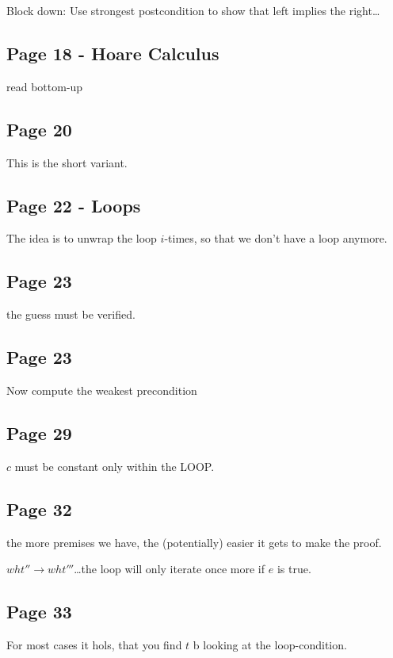 \documentclass[a4paper]{article}
\begin{document}
Block down: Use strongest postcondition to show that left implies the right\ldots

\subsection{Page 18 - Hoare Calculus}
read bottom-up

\subsection{Page 20}

This is the short variant.

\subsection{Page 22 - Loops}
The idea is to unwrap the loop $i$-times, so that we don't have a loop anymore.

\subsection{Page 23} the guess must be verified.

\subsection{Page 23}
Now compute the weakest precondition


\subsection{Page 29}
$c$ must be constant only within the LOOP.

\subsection{Page 32}
the more premises we have, the (potentially) easier it gets to make the proof.

$wht'' \rightarrow wht'''$\ldots the loop will only iterate once more if $e$
is true.


\subsection{Page 33}
For most cases it hols, that you find $t$ b looking at the loop-condition.
\end{document}
